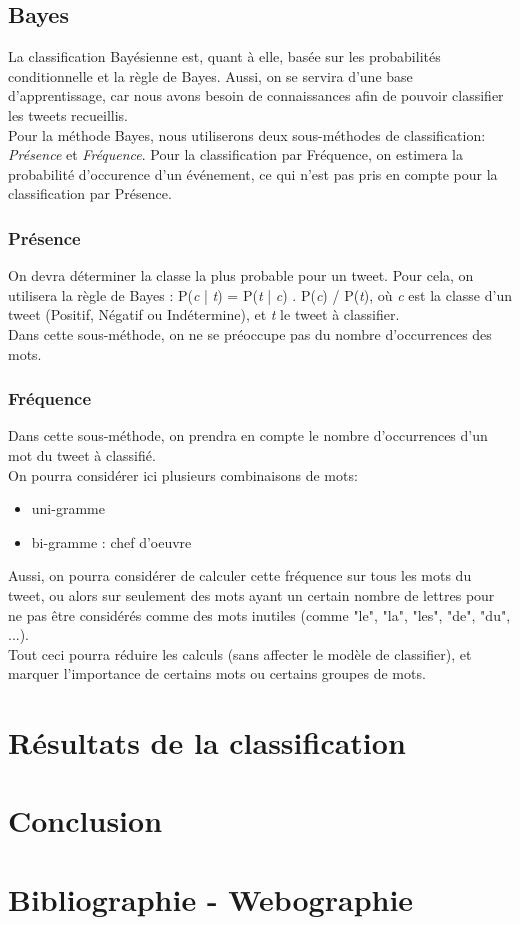 \documentclass[pdftex,12pt,a4paper]{report}
\begin{document}
\begin{spacing}{1.2}
\section{Bayes}

La classification Bayésienne est, quant à elle, basée sur les probabilités conditionnelle et la règle de Bayes. Aussi, on se servira d'une base d'apprentissage, car nous avons besoin de connaissances afin de pouvoir classifier les tweets recueillis.\\
Pour la méthode Bayes, nous utiliserons deux sous-méthodes de classification: \textit{Présence} et \textit{Fréquence}. Pour la classification par Fréquence, on estimera la probabilité d'occurence d'un événement, ce qui n'est pas pris en compte pour la classification par Présence.

\subsection{Présence}

On devra déterminer la classe la plus probable pour un tweet. Pour cela, on utilisera la règle de Bayes : P(\textit{c} | \textit{t}) = P(\textit{t} | \textit{c}) . P(\textit{c}) / P(\textit{t}), où \textit{c} est la classe d'un tweet (Positif, Négatif ou Indétermine), et \textit{t} le tweet à classifier.
\\
Dans cette sous-méthode, on ne se préoccupe pas du nombre d'occurrences des mots.

\subsection{Fréquence}

Dans cette sous-méthode, on prendra en compte le nombre d'occurrences d'un mot du tweet à classifié.
\\
On pourra considérer ici plusieurs combinaisons de mots:
\begin{itemize}
\item{uni-gramme}
\item{bi-gramme : chef d'oeuvre}
\end{itemize}
Aussi, on pourra considérer de calculer cette fréquence sur tous les mots du tweet, ou alors sur seulement des mots ayant un certain nombre de lettres pour ne pas être considérés comme des mots inutiles (comme "le", "la", "les", "de", "du", ...).
\\
Tout ceci pourra réduire les calculs (sans affecter le modèle de classifier), et marquer l'importance de certains mots ou certains groupes de mots. 

\chapter{Résultats de la classification}

\chapter{Conclusion}

\chapter*{Bibliographie - Webographie}

\end{spacing}
\end{document}
